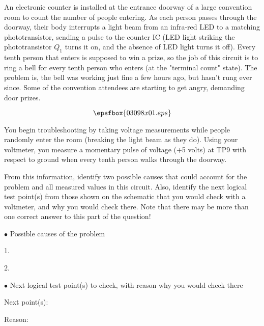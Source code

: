

An electronic counter is installed at the entrance doorway of a large convention room to count the number of people entering.  As each person passes through the doorway, their body interrupts a light beam from an infra-red LED to a matching phototransistor, sending a pulse to the counter IC (LED light striking the phototransistor $Q_1$ turns it on, and the absence of LED light turns it off).  Every tenth person that enters is supposed to win a prize, so the job of this circuit is to ring a bell for every tenth person who enters (at the "terminal count" state).  The problem is, the bell was working just fine a few hours ago, but hasn't rung ever since.  Some of the convention attendees are starting to get angry, demanding door prizes.

$$\epsfbox{03098x01.eps}$$

You begin troubleshooting by taking voltage measurements while people randomly enter the room (breaking the light beam as they do).  Using your voltmeter, you measure a momentary pulse of voltage (+5 volts) at TP9 with respect to ground when every tenth person walks through the doorway.  

From this information, identify two possible causes that could account for the problem and all measured values in this circuit.  Also, identify the next logical test point(s) from those shown on the schematic that you would check with a voltmeter, and why you would check there.  Note that there may be more than one correct answer to this part of the question!

\medskip
\goodbreak
\item{$\bullet$} Possible causes of the problem
\item{1.}
\item{2.} 
\medskip

\medskip
\item{$\bullet$} Next logical test point(s) to check, with reason why you would check there
\item{Next point(s):}
\item{Reason:}
\medskip







